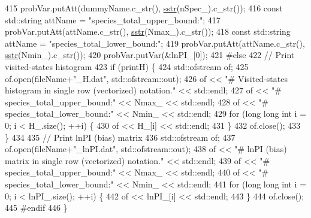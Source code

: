 \begin{DoxyCode}
415                 probVar.putAtt(dummyName.c\_str(), \hyperlink{utilities_8h_a8feb627efa8e8113cdf95f9a6151a088}{sstr}(nSpec\_).c\_str());
416                 \textcolor{keyword}{const} std::string attName = \textcolor{stringliteral}{"species\_total\_upper\_bound:"};
417                 probVar.putAtt(attName.c\_str(), \hyperlink{utilities_8h_a8feb627efa8e8113cdf95f9a6151a088}{sstr}(Nmax\_).c\_str());
418                 \textcolor{keyword}{const} std::string attName = \textcolor{stringliteral}{"species\_total\_lower\_bound:"};
419                 probVar.putAtt(attName.c\_str(), \hyperlink{utilities_8h_a8feb627efa8e8113cdf95f9a6151a088}{sstr}(Nmin\_).c\_str());
420                 probVar.putVar(&lnPI\_[0]);
421 \textcolor{preprocessor}{#else}
422                 \textcolor{comment}{// Print visited-states histogram}
423                 \textcolor{keywordflow}{if} (printH) \{
424                                 std::ofstream of;
425                                 of.open(fileName+\textcolor{stringliteral}{"\_H.dat"}, std::ofstream::out);
426                                 of << \textcolor{stringliteral}{"# Visited-states histogram in single row (vectorized) notation."} << 
      std::endl;
427                                 of << \textcolor{stringliteral}{"# species\_total\_upper\_bound:"} << Nmax\_ << std::endl;
428                                 of << \textcolor{stringliteral}{"# species\_total\_lower\_bound:"} << Nmin\_ << std::endl;
429                                 \textcolor{keywordflow}{for} (\textcolor{keywordtype}{long} \textcolor{keywordtype}{long} \textcolor{keywordtype}{int} i = 0; i < H\_.size(); ++i) \{
430                                                 of << H\_[i] << std::endl;
431                                 \}
432                                 of.close();
433                 \}
434                 
435                 \textcolor{comment}{// Print lnPI (bias) matrix}
436                 std::ofstream of;
437                 of.open(fileName+\textcolor{stringliteral}{"\_lnPI.dat"}, std::ofstream::out);
438                 of << \textcolor{stringliteral}{"# lnPI (bias) matrix in single row (vectorized) notation."} << std::endl;
439                 of << \textcolor{stringliteral}{"# species\_total\_upper\_bound:"} << Nmax\_ << std::endl;
440                 of << \textcolor{stringliteral}{"# species\_total\_lower\_bound:"} << Nmin\_ << std::endl;
441                 \textcolor{keywordflow}{for} (\textcolor{keywordtype}{long} \textcolor{keywordtype}{long} \textcolor{keywordtype}{int} i = 0; i < lnPI\_.size(); ++i) \{
442                                 of << lnPI\_[i] << std::endl;
443                 \}
444                 of.close();
445 \textcolor{preprocessor}{#endif}
446 \}
\end{DoxyCode}
\hypertarget{classwala_ae04916f49c11b0636e813787a3906570}{}
